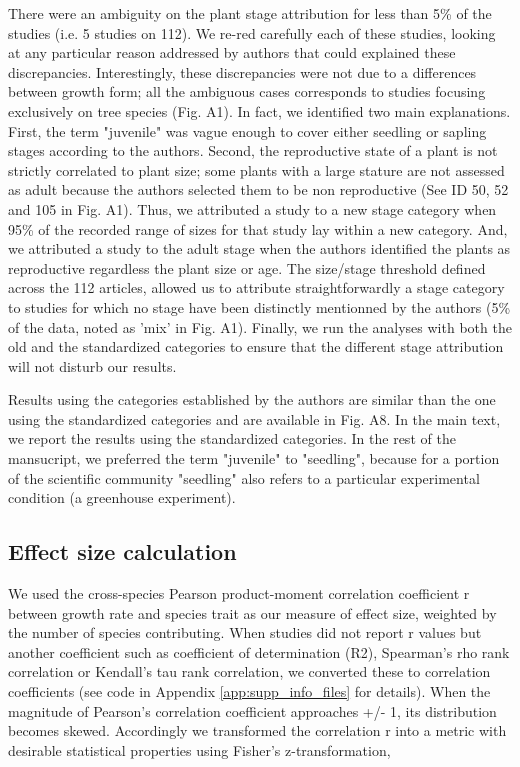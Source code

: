 \documentclass[a4paper]{article}\usepackage[]{graphicx}\usepackage[]{color}
\begin{document}
There were an ambiguity on the plant stage attribution for less than 5\% of the studies (i.e. 5 studies on 112). We re-red carefully each of these studies, looking at any particular reason addressed by authors that could explained these discrepancies. Interestingly, these discrepancies were not due to a differences between growth form; all the ambiguous cases corresponds to studies focusing exclusively on tree species (Fig. A1). In fact, we identified two main explanations. First, the term "juvenile" was vague enough to cover either seedling or sapling stages according to the authors. Second, the reproductive state of a plant is not strictly correlated to plant size; some plants with a large stature are not assessed as adult because the authors selected them to be non reproductive (See ID 50, 52 and 105 in Fig. A1). Thus, we attributed a study to a new stage category when 95\% of the recorded range of sizes for that study lay within a new category. And, we attributed a study to the adult stage when the authors identified the plants as reproductive regardless the plant size or age. The size/stage threshold defined across the 112 articles, allowed us to attribute straightforwardly a stage category to studies for which no stage have been distinctly mentionned by the authors (5\% of the data, noted as 'mix' in Fig. A1). Finally, we run the analyses with both the old and the standardized categories to ensure that the different stage attribution will not disturb our results. 

Results using the categories established by the authors are similar than the one using the standardized categories and are available in Fig. A8. In the main text, we report the results using the standardized categories. In the rest of the mansucript, we preferred the term "juvenile" to "seedling", because for a portion of the scientific community "seedling" also refers to a particular experimental condition (a greenhouse experiment).



\subsection*{Effect size calculation}\label{effect-size-calculation}

We used the cross-species Pearson product-moment correlation coefficient r between growth rate and species trait as our measure of effect size, weighted by the number of species contributing. When studies did not report r values but another coefficient such as coefficient of determination (R2), Spearman's rho rank correlation or Kendall's tau rank correlation, we converted these to correlation coefficients  \citep{Lajeunesse:2013tm} (see code in Appendix \ref{app:supp_info_files} for details). When the magnitude of Pearson's correlation coefficient approaches +/- 1, its distribution becomes skewed. Accordingly we transformed the correlation r into a metric with desirable statistical properties using Fisher's z-transformation,
\end{document}

